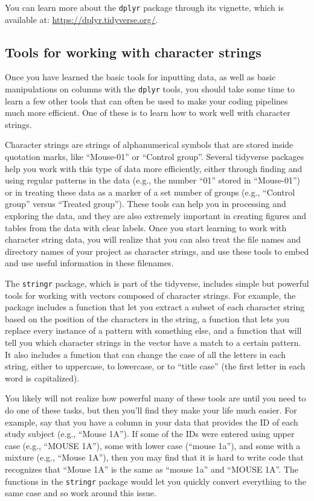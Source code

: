 \documentclass[]{tufte-book}
\begin{document}
You can learn more about the \texttt{dplyr} package through its vignette, which is
available at: \url{https://dplyr.tidyverse.org/}.

\subsection{Tools for working with character strings}\label{tools-for-working-with-character-strings}

Once you have learned the basic tools for inputting data, as well as basic
manipulations on columns with the \texttt{dplyr} tools, you should take some time to
learn a few other tools that can often be used to make your coding pipelines
much more efficient. One of these is to learn how to work well with character
strings.

Character strings are strings of alphanumerical symbols that are stored inside
quotation marks, like ``Mouse-01'' or ``Control group''. Several tidyverse packages
help you work with this type of data more efficiently, either through finding
and using regular patterns in the data (e.g., the number ``01'' stored in
``Mouse-01'') or in treating these data as a marker of a set number of groups
(e.g., ``Control group'' versus ``Treated group''). These tools can help you in
processing and exploring the data, and they are also extremely important in
creating figures and tables from the data with clear labels. Once you start
learning to work with character string data, you will realize that you can also
treat the file names and directory names of your project as character strings,
and use these tools to embed and use useful information in these filenames.

The \texttt{stringr} package, which is part of the tidyverse, includes simple but
powerful tools for working with vectors composed of character strings. For
example, the package includes a function that let you extract a subset of each
character string based on the position of the characters in the string, a
function that lets you replace every instance of a pattern with something
else, and a function that will tell you which character strings in the vector
have a match to a certain pattern. It also includes a function that can change
the case of all the letters in each string, either to uppercase, to lowercase,
or to ``title case'' (the first letter in each word is capitalized).

You likely will not realize how powerful many of these tools are until you need
to do one of these tasks, but then you'll find they make your life much easier.
For example, say that you have a column in your data that provides the ID of
each study subject (e.g., ``Mouse 1A''). If some of the IDs were entered using
upper case (e.g., ``MOUSE 1A''), some with lower case (``mouse 1a''), and some with
a mixture (e.g., ``Mouse 1A''), then you may find that it is hard to write code
that recognizes that ``Mouse 1A'' is the same as ``mouse 1a'' and ``MOUSE 1A''. The
functions in the \texttt{stringr} package would let you quickly convert everything to
the same case and so work around this issue.
\end{document}
